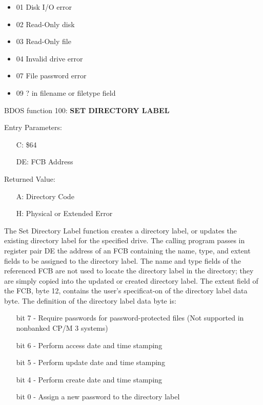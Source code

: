 \begin{itemize}
\item 01 Disk I/O error
\item 02 Read-Only disk
\item 03 Read-Only file
\item 04 Invalid drive error
\item 07 File password error
\item 09 ? in filename or filetype field
\end{itemize}

BDOS function 100: \textbf{SET DIRECTORY LABEL}

Entry Parameters:
\begin{itemize}
\item[] C: \$64
\item[] DE: FCB Address
\end{itemize}

Returned Value:
\begin{itemize}
\item[] A: Directory Code
\item[] H: Physical or Extended Error
\end{itemize}

The Set Directory Label function creates a directory label, or updates
the existing directory label for the specified drive. The calling
program passes in register pair DE the address of an FCB containing
the name, type, and extent fields to be assigned to the directory
label. The name and type fields of the referenced FCB are not used to
locate the directory label in the directory; they are simply copied
into the updated or created directory label. The extent field of the
FCB, byte 12, contains the user's specificat-on of the directory label
data byte. The definition of the directory label data byte is:

\begin{itemize}
\item[bit] 7 - Require passwords for password-protected files (Not
  supported in nonbanked CP/M 3 systems)
\item[bit] 6 - Perform access date and time stamping
\item[bit] 5 - Perform update date and time stamping
\item[bit] 4 - Perform create date and time stamping
\item[bit] 0 - Assign a new password to the directory label
\end{itemize}

